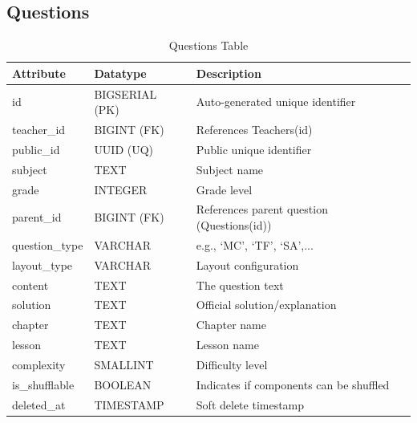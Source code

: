 \documentclass[../report_main.tex]{subfiles}
\begin{document}
\subsection{Questions}
\begin{table}[H]
\centering
\caption{Questions Table}
\label{tab:questions}
\renewcommand{\arraystretch}{1.25}
\begin{tabular}{|p{3cm}|p{3.5cm}|p{8.5cm}|}
\hline
\textbf{Attribute} & \textbf{Datatype} & \textbf{Description} \\ \hline
id & BIGSERIAL (PK) & Auto-generated unique identifier \\ \hline
teacher\_id & BIGINT (FK) & References Teachers(id) \\ \hline
public\_id & UUID (UQ) & Public unique identifier \\ \hline
subject & TEXT & Subject name \\ \hline
grade & INTEGER & Grade level \\ \hline
parent\_id & BIGINT (FK) & References parent question (Questions(id)) \\ \hline
question\_type & VARCHAR & e.g., `MC', `TF', `SA',... \\ \hline
layout\_type & VARCHAR & Layout configuration \\ \hline
content & TEXT & The question text \\ \hline
solution & TEXT & Official solution/explanation \\ \hline
chapter & TEXT & Chapter name \\ \hline
lesson & TEXT & Lesson name \\ \hline
complexity & SMALLINT & Difficulty level \\ \hline
is\_shufflable & BOOLEAN & Indicates if components can be shuffled \\ \hline
deleted\_at & TIMESTAMP & Soft delete timestamp \\ \hline
\end{tabular}
\end{table}
\end{document}
